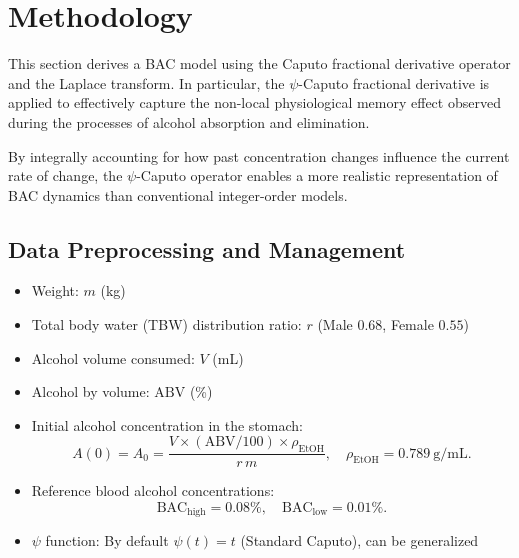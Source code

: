 \documentclass[11pt]{article}
\begin{document}

\section{Methodology}

This section derives a BAC model using the Caputo fractional derivative operator and the Laplace transform. In particular, the \(\psi\)-Caputo fractional derivative is applied to effectively capture the non-local physiological memory effect observed during the processes of alcohol absorption and elimination.

By integrally accounting for how past concentration changes influence the current rate of change, the \(\psi\)-Caputo operator enables a more realistic representation of BAC dynamics than conventional integer-order models.

\subsection{Data Preprocessing and Management}
\begin{itemize}
  \item Weight: $m$ (kg)
  \item Total body water (TBW) distribution ratio: $r$ (Male $0.68$, Female $0.55$)
  \item Alcohol volume consumed: $V$ (mL)
  \item Alcohol by volume: $\mathrm{ABV}$ (\%)
  \item Initial alcohol concentration in the stomach:
    \[
      A(0) = A_0 
      = \frac{V \times (\mathrm{ABV}/100)\times \rho_{\mathrm{EtOH}}}{r\,m},
      \quad \rho_{\mathrm{EtOH}} = 0.789\ \mathrm{g/mL}.
    \]
  \item Reference blood alcohol concentrations:
    \[
      \mathrm{BAC}_{\mathrm{high}} = 0.08\%, 
      \quad
      \mathrm{BAC}_{\mathrm{low}} = 0.01\%.
    \]
  \item \(\psi\) function: By default $\psi(t)=t$ (Standard Caputo), can be generalized
\end{itemize}
\end{document}
